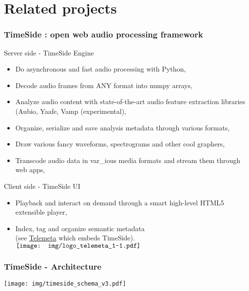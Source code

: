 \documentclass[10pt, final, hyperref, table]{beamer}
\begin{document}
\section{Related projects}
\frame{\tableofcontents[currentsection]}

\begin{frame}
 \frametitle{TimeSide : open web audio processing framework}%
\begin{block}{Server side - TimeSide Engine}
  \begin{itemize}
  \item \alert{Do} asynchronous and fast audio processing with Python,
  \item \alert{Decode} audio frames from ANY format into numpy arrays,
  \item \alert{Analyze} audio content with state-of-the-art audio feature extraction libraries (Aubio, Yaafe, Vamp (experimental),
  \item  \alert{Organize}, serialize and save analysis metadata through various formats,
  \item  \alert{Draw} various fancy waveforms, spectrograms and other cool graphers,
  \item  \alert{Transcode} audio data in var\_ious media formats and stream them through web apps,
  \end{itemize}
 
\end{block}
\begin{block}{Client side - TimeSide UI}
  \begin{itemize}
  \item   \alert{Playback} and  \alert{interact} on demand through a smart high-level HTML5 extensible player,
  \item   \alert{Index},  \alert{tag} and  \alert{organize semantic metadata} \\
(see \href{http://telemeta.org/}{Telemeta} which embeds TimeSide). 
\hfill $\vcenter{\hbox{\texttt{[image: img/logo\_telemeta\_1-1.pdf]}}}$
  \end{itemize}
\end{block}
\end{frame}

\begin{frame}
  \frametitle{TimeSide - Architecture}
  \begin{center}
    \texttt{[image: img/timeside\_schema\_v3.pdf]}
  \end{center}
\end{frame}
\end{document}
